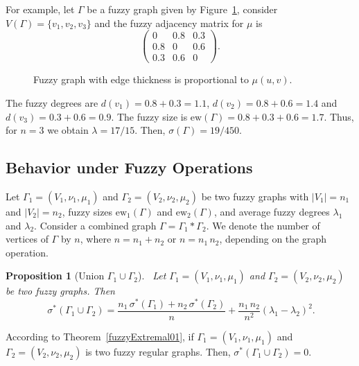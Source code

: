 \documentclass[12pt]{amsart}
\newtheorem{proposition}{Proposition}[section]
\newcommand{\ew}{\mathrm{ew}}
\newcommand{\SF}{\sigma^*}
\begin{document}
\medskip 

For example, let $\Gamma$ be a fuzzy graph given by Figure~\ref{fig001fuzzygraph},  consider $V(\Gamma)=\{v_1,v_2,v_3\}$ and the fuzzy adjacency matrix for $\mu$ is
\[
\begin{pmatrix}
0 & 0.8 & 0.3 \\
0.8 & 0 & 0.6 \\
0.3 & 0.6 & 0
\end{pmatrix}.
\]
\begin{figure}[H]
\centering
{}
\caption{Fuzzy graph with edge thickness is proportional to $\mu(u,v)$.}
\label{fig001fuzzygraph}
\end{figure}
The  fuzzy degrees are $d(v_1) = 0.8 + 0.3 = 1.1$, $d(v_2)= 0.8 + 0.6 = 1.4$ and $d(v_3)= 0.3 + 0.6 = 0.9$. 
The fuzzy size is $\ew(\Gamma)= 0.8 + 0.3 + 0.6 = 1.7$. Thus, for $n=3$ we obtain $\lambda=17/15$. Then, $\sigma(\Gamma)=19/450$. 

\subsection{Behavior under Fuzzy Operations}
Let $\Gamma_1=(V_1, \nu_1, \mu_1)$ and $\Gamma_2=(V_2, \nu_2, \mu_2)$ be two fuzzy graphs with $|V_1|=n_1$ and $|V_2|=n_2$, fuzzy sizes $\ew_1(\Gamma)$ and $\ew_2(\Gamma)$, and average fuzzy degrees $\lambda_1$ and $\lambda_2$. 
Consider a combined graph $\Gamma=\Gamma_1*\Gamma_2$. We denote the number of vertices of $\Gamma$ by $n$, where $n=n_1+n_2$ or $n=n_1\,n_2$, depending on the graph operation.

\begin{proposition}[Union $\Gamma_1\cup \Gamma_2$]~\label{Unionfuzzy01}
Let $\Gamma_1=(V_1, \nu_1, \mu_1)$ and $\Gamma_2=(V_2, \nu_2, \mu_2)$ be two fuzzy graphs. Then
\begin{equation}~\label{eqq1Unionfuzzy01}
\SF(\Gamma_1\cup \Gamma_2)=\frac{n_1\, \SF(\Gamma_1)+n_2\, \SF(\Gamma_2)}{n}+ \frac{n_1\,n_2}{n^2}(\lambda_1-\lambda_2)^2.
\end{equation}
\end{proposition}
According to Theorem~\ref{fuzzyExtremal01}, if $\Gamma_1=(V_1, \nu_1, \mu_1)$ and $\Gamma_2=(V_2, \nu_2, \mu_2)$ is two  fuzzy  regular graphs. Then, $\SF(\Gamma_1\cup \Gamma_2)=0$.
\end{document}
